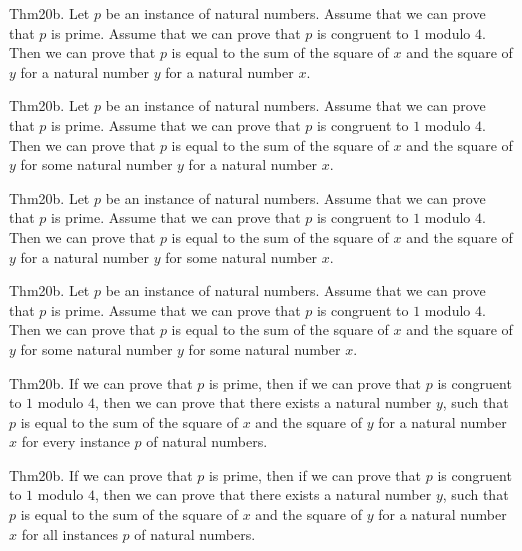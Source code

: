 \documentclass{article}
\begin{document}
Thm20b. Let $p$ be an instance of natural numbers. Assume that we can prove that $p$ is prime. Assume that we can prove that $p$ is congruent to $1$ modulo $4$. Then we can prove that $p$ is equal to the sum of the square of $x$ and the square of $y$ for a natural number $y$ for a natural number $x$.

Thm20b. Let $p$ be an instance of natural numbers. Assume that we can prove that $p$ is prime. Assume that we can prove that $p$ is congruent to $1$ modulo $4$. Then we can prove that $p$ is equal to the sum of the square of $x$ and the square of $y$ for some natural number $y$ for a natural number $x$.

Thm20b. Let $p$ be an instance of natural numbers. Assume that we can prove that $p$ is prime. Assume that we can prove that $p$ is congruent to $1$ modulo $4$. Then we can prove that $p$ is equal to the sum of the square of $x$ and the square of $y$ for a natural number $y$ for some natural number $x$.

Thm20b. Let $p$ be an instance of natural numbers. Assume that we can prove that $p$ is prime. Assume that we can prove that $p$ is congruent to $1$ modulo $4$. Then we can prove that $p$ is equal to the sum of the square of $x$ and the square of $y$ for some natural number $y$ for some natural number $x$.

Thm20b. If we can prove that $p$ is prime, then if we can prove that $p$ is congruent to $1$ modulo $4$, then we can prove that there exists a natural number $y$, such that $p$ is equal to the sum of the square of $x$ and the square of $y$ for a natural number $x$ for every instance $p$ of natural numbers.

Thm20b. If we can prove that $p$ is prime, then if we can prove that $p$ is congruent to $1$ modulo $4$, then we can prove that there exists a natural number $y$, such that $p$ is equal to the sum of the square of $x$ and the square of $y$ for a natural number $x$ for all instances $p$ of natural numbers.
\end{document}
